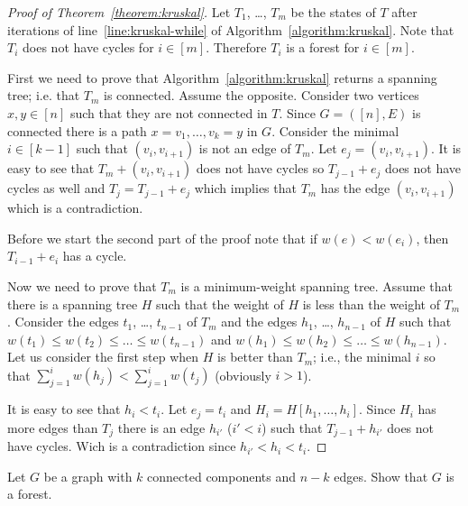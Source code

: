 \begin{proof}[Proof of Theorem~\ref{theorem:kruskal}]
  Let $T_1$, \dots, $T_m$ be the states of $T$ after iterations of
  line~\ref{line:kruskal-while} of Algorithm~\ref{algorithm:kruskal}.
  Note that $T_i$ does not have cycles for $i \in [m]$. Therefore $T_i$ is a
  forest for $i \in [m]$.

  First we need to prove that Algorithm~\ref{algorithm:kruskal} returns a
  spanning tree; i.e. that $T_m$ is connected.
  Assume the opposite. Consider two vertices $x, y \in [n]$ such that
  they are not connected in $T$. Since $G = ([n], E)$ is connected there is a
  path $x = v_1, \dots, v_k = y$ in $G$. Consider the minimal $i \in [k - 1]$
  such that $(v_i, v_{i + 1})$ is not an edge of $T_m$. Let
  $e_j = (v_i, v_{i + 1})$. It is easy to see that $T_m + (v_i, v_{i + 1})$ does
  not have cycles so $T_{j - 1} + e_j$ does not have cycles as well and $T_j =
  T_{j - 1} + e_j$ which implies that $T_m$ has the edge $(v_i, v_{i + 1})$
  which is a contradiction.

  Before we start the second part of the proof note that if $w(e) < w(e_i)$,
  then $T_{i - 1} + e_i$ has a cycle.

  Now we need to prove that $T_m$ is a minimum-weight spanning tree. Assume
  that there is a spanning tree $H$ such that the weight of $H$ is less than
  the weight of $T_m$. Consider the edges $t_1$, \dots, $t_{n - 1}$ of $T_m$
  and the edges $h_1$, \dots, $h_{n - 1}$ of $H$ such that
  $w(t_1) \le w(t_2) \le \dots \le w(t_{n - 1})$ and
  $w(h_1) \le w(h_2) \le \dots \le w(h_{n - 1})$.
  Let us consider the first step when $H$ is better than $T_m$; i.e., the
  minimal $i$ so that $\sum_{j = 1}^i w(h_j) < \sum_{j = 1}^i w(t_j)$
  (obviously $i > 1$).

  It is easy to see that $h_i < t_i$. Let $e_j = t_i$ and
  $H_i = H[h_1, \dots, h_i]$. Since $H_i$ has more edges than $T_j$ there is an
  edge $h_{i'}$ ($i' < i$) such that $T_{j - 1} + h_{i'}$ does not have cycles.
  Wich is a contradiction since $h_{i'} < h_i < t_i$.
\end{proof}


\begin{chapterendexercises}
  \exercise[recommended] Let $G$ be a graph with $k$ connected components and
    $n - k$ edges. Show that $G$ is a forest.
\end{chapterendexercises}
